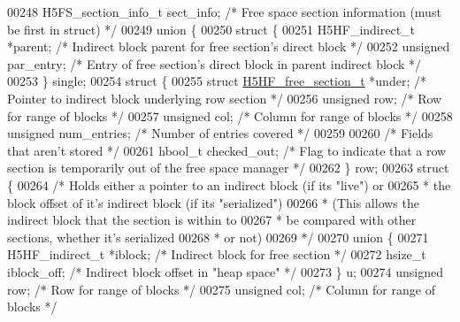 \begin{DoxyCode}
00248     H5FS\_section\_info\_t sect\_info;              \textcolor{comment}{/* Free space section information (must be first in struct)
       */}
00249     \textcolor{keyword}{union }\{
00250         \textcolor{keyword}{struct }\{
00251             H5HF\_indirect\_t *parent;            \textcolor{comment}{/* Indirect block parent for free section's direct block */}
00252             \textcolor{keywordtype}{unsigned} par\_entry;                 \textcolor{comment}{/* Entry of free section's direct block in parent indirect
       block */}
00253         \} single;
00254         \textcolor{keyword}{struct }\{
00255             \textcolor{keyword}{struct }\hyperlink{struct_h5_h_f__free__section__t}{H5HF\_free\_section\_t} *under;  \textcolor{comment}{/* Pointer to indirect block underlying
       row section */}
00256             \textcolor{keywordtype}{unsigned}    row;                    \textcolor{comment}{/* Row for range of blocks */}
00257             \textcolor{keywordtype}{unsigned}    col;                    \textcolor{comment}{/* Column for range of blocks */}
00258             \textcolor{keywordtype}{unsigned}    num\_entries;            \textcolor{comment}{/* Number of entries covered */}
00259 
00260             \textcolor{comment}{/* Fields that aren't stored */}
00261             hbool\_t     checked\_out;            \textcolor{comment}{/* Flag to indicate that a row section is temporarily out
       of the free space manager */}
00262         \} row;
00263         \textcolor{keyword}{struct }\{
00264             \textcolor{comment}{/* Holds either a pointer to an indirect block (if its "live") or}
00265 \textcolor{comment}{             *  the block offset of it's indirect block (if its "serialized")}
00266 \textcolor{comment}{             *  (This allows the indirect block that the section is within to}
00267 \textcolor{comment}{             *          be compared with other sections, whether it's serialized}
00268 \textcolor{comment}{             *          or not)}
00269 \textcolor{comment}{             */}
00270             \textcolor{keyword}{union }\{
00271                 H5HF\_indirect\_t *iblock;        \textcolor{comment}{/* Indirect block for free section */}
00272                 hsize\_t iblock\_off;             \textcolor{comment}{/* Indirect block offset in "heap space" */}
00273             \} u;
00274             \textcolor{keywordtype}{unsigned}    row;                    \textcolor{comment}{/* Row for range of blocks */}
00275             \textcolor{keywordtype}{unsigned}    col;                    \textcolor{comment}{/* Column for range of blocks */}

\end{DoxyCode}
